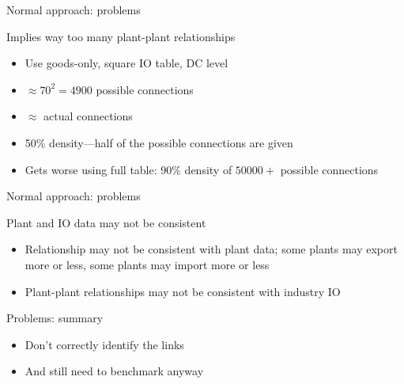 \documentclass[12pt]{beamer}
\begin{document}
\begin{frame}{Normal approach: problems}

\begin{block}{Implies way too many plant-plant relationships}
\begin{itemize}
\item Use goods-only, square IO table, DC level
\item $\approx 70^2 = 4900$ possible connections
\item $\approx $ actual connections
\item 50\% density---half of the possible connections are given
\item Gets worse using full table: 90\% density of $50000+$ possible connections
\end{itemize}
\end{block}





\end{frame}

\begin{frame}{Normal approach: problems}


\begin{block}{Plant and IO data may not be consistent}
\begin{itemize}
\item Relationship may not be consistent with plant data; some plants may export more or less, some plants may import more or less %
\item Plant-plant relationships may not be consistent with industry IO
\end{itemize}
\end{block}


\begin{block}{Problems: summary}
\begin{itemize}
\item Don't correctly identify the links
\item And still need to benchmark anyway
\end{itemize}
\end{block}

\end{frame}
\end{document}
